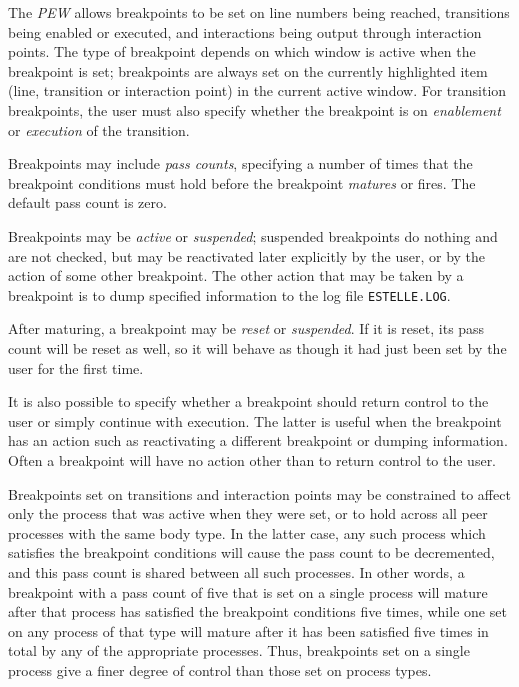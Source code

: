 The {\em PEW} allows breakpoints to be set on line numbers being
reached, transitions being enabled or executed, and interactions
being output through interaction points. The type of breakpoint
depends on which window is active when the breakpoint is set;
breakpoints are always set on the currently highlighted item (line,
transition or interaction point) in the current active window. For
transition breakpoints, the user must also specify whether the
breakpoint is on {\em enablement} or {\em execution} of the
transition.

Breakpoints may include {\em pass counts}, specifying a number of
times that the breakpoint conditions must hold before the breakpoint
{\em matures} or fires. The default pass count is zero.

Breakpoints may be {\em active} or {\em suspended}; suspended
breakpoints do nothing and are not checked, but may be reactivated
later explicitly by the user, or by the action of some other
breakpoint. The other action that may be taken by a breakpoint is to
dump specified information to the log file {\tt ESTELLE.LOG}.

After maturing, a breakpoint may be {\em reset} or {\em suspended}.
If it is reset, its pass count will be reset as well, so it will
behave as though it had just been set by the user for the first time.

It is also possible to specify  whether a breakpoint should return
control to the user or simply continue with execution. The latter is
useful when the breakpoint has an action such as reactivating a
different breakpoint or dumping information. Often a breakpoint will
have no action other than to return control to the user.

Breakpoints set on transitions and interaction points may be
constrained to affect only the process that was active when they were
set, or to hold across all peer processes with the same body type. In
the latter case, any such process which satisfies the breakpoint
conditions will cause the pass count to be decremented, and this pass
count is shared between all such processes. In other words, a
breakpoint with a pass count of five that is set on a single process
will mature after that process has satisfied the breakpoint
conditions five times, while one set on any process of that type will
mature after it has been satisfied five times in total by any of the
appropriate processes. Thus, breakpoints set on a single process give
a finer degree of control than those set on process types.

